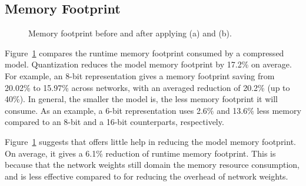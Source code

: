 \subsection{Memory Footprint}

\begin{figure}[!t]
\centering
{}
\hfill
\hspace{-2mm}
\hfill

\caption{Memory footprint before and after applying \quantization(a) and \pruning (b).} \label{fig:footprint}
\vspace{-6mm}
\end{figure}

Figure~\ref{fig:footprint} compares the runtime memory footprint consumed by a compressed model. Quantization reduces the model memory
footprint by 17.2\% on average. For example, an 8-bit representation gives a memory footprint saving from 20.02\% to 15.97\% across
networks, with an averaged reduction of 20.2\% (up to 40\%). In general, the smaller the model is, the less memory footprint it will
consume. As an example, a 6-bit representation uses 2.6\% and 13.6\% less memory compared to an 8-bit and a 16-bit counterparts,
respectively.

Figure~\ref{fig:footprint} suggests that  \pruning offers little help in reducing the model memory footprint. On average, it gives a 6.1\%
reduction of runtime memory footprint. This is because that the network weights still domain the memory resource consumption, and \pruning
is less effective compared to \dquantization for reducing the overhead of network weights.



